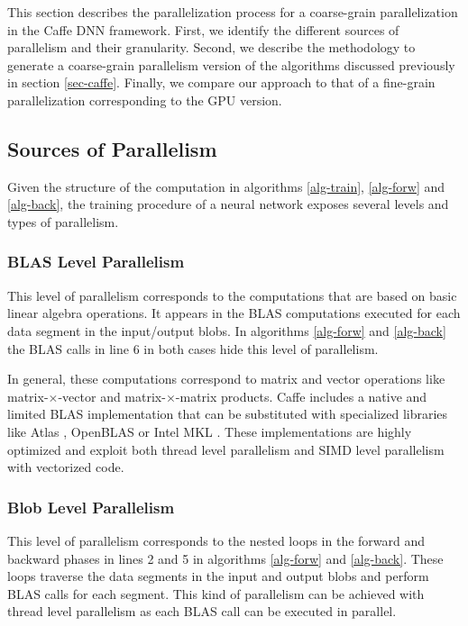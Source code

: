 This section describes the parallelization process for a coarse-grain 
parallelization in the Caffe DNN framework. First, we identify the 
different sources of parallelism and their granularity. Second, we 
describe the methodology to generate a coarse-grain parallelism version 
of the algorithms discussed previously in section \ref{sec-caffe}. Finally, 
we compare our approach to that of a fine-grain parallelization 
corresponding to the GPU version.

\subsection{Sources of Parallelism}
Given the structure of the computation in algorithms \ref{alg-train}, 
\ref{alg-forw} and \ref{alg-back}, the training procedure of a neural 
network exposes several levels and types of parallelism.

\subsubsection{BLAS Level Parallelism}
This level of parallelism corresponds to the computations that 
are based on basic linear algebra operations. It appears in the 
BLAS computations executed for each data segment in the input/output blobs.
In algorithms \ref{alg-forw} and \ref{alg-back} the BLAS calls in line 
6 in both cases hide this level of parallelism.

In general, these computations correspond to matrix and
vector operations like matrix-$\times$-vector and matrix-$\times$-matrix
products. Caffe includes a native and limited BLAS implementation that 
can be substituted with specialized libraries like Atlas \cite{Atlas}, OpenBLAS \cite{OpenBLAS} or Intel MKL \cite{MKL}. These implementations are 
highly optimized and exploit both thread level parallelism and SIMD level parallelism with vectorized code.

\subsubsection{Blob Level Parallelism}
This level of parallelism corresponds to the nested loops in the forward
and backward phases in lines 2 and 5 in algorithms 
\ref{alg-forw} and \ref{alg-back}. 
These loops traverse the data segments in the input and output blobs and
perform BLAS calls for each segment. This kind of parallelism can be
achieved with thread level parallelism as each BLAS call can be
executed in parallel.


